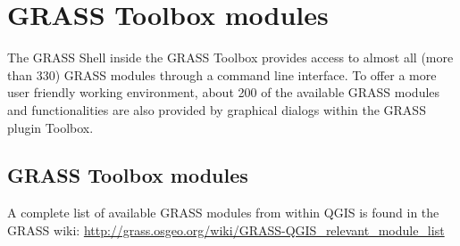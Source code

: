 \chapter{GRASS Toolbox modules}\label{appdx_grass_toolbox_modules}


The GRASS Shell inside the GRASS Toolbox provides access to almost all (more 
than 330) GRASS modules through a command line interface. To offer a more user
friendly working environment, about 200 of the available GRASS modules and 
functionalities are also provided by graphical dialogs within the GRASS plugin Toolbox.

\section{GRASS Toolbox modules}

A complete list of available GRASS modules from within QGIS is found in the GRASS wiki: 
\url{http://grass.osgeo.org/wiki/GRASS-QGIS_relevant_module_list} 

